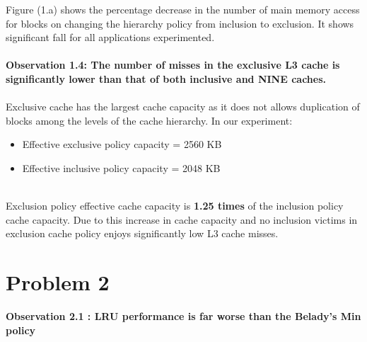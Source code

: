 \documentclass[]{article}
\begin{document}
Figure (1.a) shows the percentage decrease in the number of main memory access for blocks on changing the hierarchy policy from inclusion to exclusion. It shows significant fall for all applications experimented.
\\\\
\textbf{Observation 1.4: The number of misses in the exclusive L3 cache is significantly lower than that of both inclusive and NINE caches.}
\\
\\
Exclusive cache has the largest cache capacity as it does not allows duplication of blocks among the levels of the cache hierarchy. In our experiment: 
\begin{itemize}
    \item Effective exclusive policy capacity = 2560 KB
    \item Effective inclusive policy capacity = 2048 KB
\end{itemize}
\\
Exclusion policy effective cache capacity is \textbf{1.25 times} of the inclusion policy cache capacity. Due to this increase in cache capacity and no inclusion victims in exclusion cache policy enjoys significantly low L3 cache misses.\\
\pagebreak

\section*{Problem 2}
\textbf{Observation 2.1 : LRU performance is far worse than the Belady's Min policy}
\end{document}
